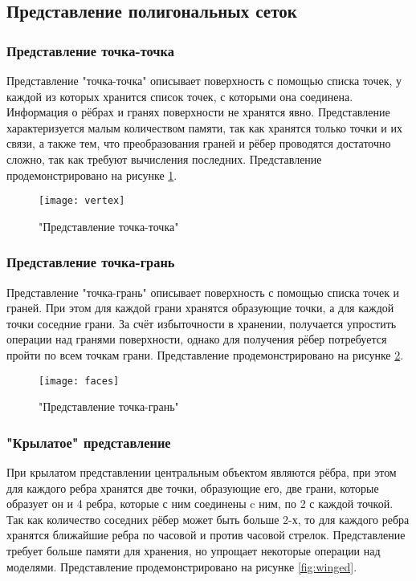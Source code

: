 \subsection{Представление полигональных сеток}
\subsubsection{Представление точка-точка}
Представление "точка-точка" описывает поверхность с помощью списка точек, у каждой из которых хранится список точек, с которыми она соединена. Информация о рёбрах и гранях поверхности не хранятся явно. Представление характеризуется малым количеством памяти, так как хранятся только точки и их связи, а также тем, что преобразования граней и рёбер проводятся достаточно сложно, так как требуют вычисления последних. Представление продемонстрировано на рисунке \ref{fig:vertex-vertex}.

\begin{figure}[h]
	\centering
	\texttt{[image: vertex]}
	\caption{"Представление точка-точка"}
	\label{fig:vertex-vertex}
\end{figure}


\subsubsection{Представление точка-грань}
Представление "точка-грань" описывает поверхность с помощью списка точек и граней. При этом для каждой грани хранятся образующие точки, а для каждой точки соседние грани. За счёт избыточности в хранении, получается упростить операции над гранями поверхности, однако для получения рёбер потребуется пройти по всем точкам грани. Представление продемонстрировано на рисунке \ref{fig:vertex-face}.

\begin{figure}[h]
	\centering
	\texttt{[image: faces]}
	\caption{"Представление точка-грань"}
	\label{fig:vertex-face}
\end{figure}

\subsubsection{"Крылатое" представление}
При крылатом представлении центральным объектом являются рёбра, при этом для каждого ребра хранятся две точки, образующие его, две грани, которые образует он и 4 ребра, которые с ним соединены c ним, по 2 с каждой точкой. Так как количество соседних рёбер может быть больше 2-х, то для каждого ребра хранятся ближайшие ребра по часовой и против часовой стрелок.
Представление требует больше памяти для хранения, но упрощает некоторые операции над моделями.
Представление продемонстрировано на рисунке \ref{fig:winged}.

